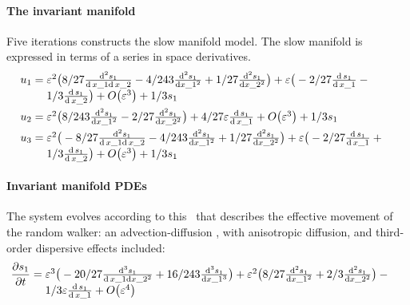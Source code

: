 \paragraph{The invariant manifold} 
Five iterations constructs the slow manifold model.
The slow manifold is expressed in terms of a series in space derivatives.
\begin{align*}&
u_{1}=\ParMath{ \eps^{2} \big(8/27 \frac{{\rm d}^{2}s_{1}}{
{\rm d}\,x\_1{\rm d}\,x\_2}-4/243 \frac{{\rm d}^{2}s_{1}}{{\rm d}x\_1^{2
}}+1/27 \frac{{\rm d}^{2}s_{1}}{{\rm d}x\_2^{2}}\big)+\eps \big(-2/27 
\frac{{\rm d}\,s_{1}}{{\rm d}\,x\_1}-1/3 \frac{{\rm d}\,s_{1}}{{\rm d}\,
x\_2}\big)+O\big(\varepsilon ^{3}\big)+1/3 s_{1}
}\\&
u_{2}=\ParMath{ \eps^{2}
 \big(8/243 \frac{{\rm d}^{2}s_{1}}{{\rm d}x\_1^{2}}-2/27 \frac{{\rm d}
^{2}s_{1}}{{\rm d}x\_2^{2}}\big)+4/27 \eps \frac{{\rm d}\,s_{1}}{{\rm d}
\,x\_1}+O\big(\varepsilon ^{3}\big)+1/3 s_{1}
}\\&
u_{3}=\ParMath{ \eps^{2} \big(-8/27 \frac{{\rm d}^{2}s_{1}}{
{\rm d}\,x\_1{\rm d}\,x\_2}-4/243 \frac{{\rm d}^{2}s_{1}}{{\rm d}x\_1^{2
}}+1/27 \frac{{\rm d}^{2}s_{1}}{{\rm d}x\_2^{2}}\big)+\eps \big(-2/27 
\frac{{\rm d}\,s_{1}}{{\rm d}\,x\_1}+1/3 \frac{{\rm d}\,s_{1}}{{\rm d}\,
x\_2}\big)+O\big(\varepsilon ^{3}\big)+1/3 s_{1}
}\end{align*}

 
\paragraph{Invariant manifold PDEs} 
The system evolves according to this \pde\ that describes the effective movement of the random walker: an advection-diffusion \pde, with anisotropic diffusion, and third-order dispersive effects included:
\begin{align*}&
\D t{s_{1}}=\ParMath{ \eps^{3} \big(-20/27 
\frac{{\rm d}^{3}s_{1}}{{\rm d}\,x\_1{\rm d}x\_2^{2}}+16/243 \frac{
{\rm d}^{3}s_{1}}{{\rm d}x\_1^{3}}\big)+\eps^{2} \big(8/27 \frac{{\rm d}
^{2}s_{1}}{{\rm d}x\_1^{2}}+2/3 \frac{{\rm d}^{2}s_{1}}{{\rm d}x\_2^{2}}
\big)-1/3 \eps \frac{{\rm d}\,s_{1}}{{\rm d}\,x\_1}+O\big(\varepsilon ^{
4}\big)
}\end{align*}


